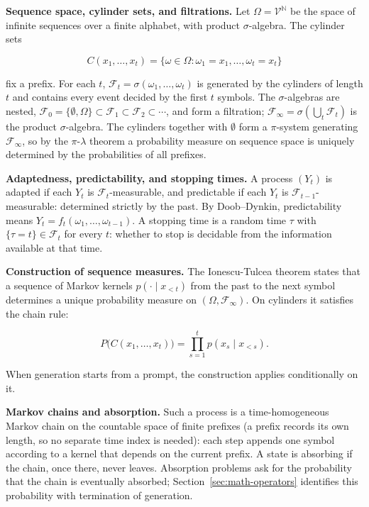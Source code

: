 \textbf{Sequence space, cylinder sets, and filtrations.} Let \(\Omega =
\mathcal{V}^{\mathbb{N}}\) be the space of infinite sequences over a finite
alphabet, with product \(\sigma\)-algebra. The cylinder sets

\[
C(x_1, \dots, x_t) = \{ \omega \in \Omega : \omega_1 = x_1, \dots, \omega_t = x_t \}
\]

fix a prefix. For each \(t\), \(\mathcal{F}_{t} = \sigma(\omega_{1}, \ldots, \omega_{t})\) is
generated by the cylinders of length \(t\) and contains every event decided
by the first \(t\) symbols. The \(\sigma\)-algebras are nested, \(\mathcal{F}_{0} = \{\emptyset, \Omega\}
\subset \mathcal{F}_{1} \subset \mathcal{F}_{2} \subset \cdots\), and form a filtration; \(\mathcal{F}_\infty = \sigma(\bigcup_{t}
\mathcal{F}_{t})\) is the product \(\sigma\)-algebra. The cylinders together with \(\emptyset\) form
a \(\pi\)-system generating \(\mathcal{F}_\infty\), so by the \(\pi\)-\(\lambda\) theorem a probability measure
on sequence space is uniquely determined by the probabilities of all
prefixes.

\textbf{Adaptedness, predictability, and stopping times.} A process
\((Y_t)\) is adapted if each \(Y_t\) is \(\mathcal{F}_t\)-measurable, and predictable if
each \(Y_t\) is \(\mathcal{F}_{t-1}\)-measurable: determined strictly by the past. By
Doob--Dynkin, predictability means \(Y_t = f_t(\omega_{1}, \ldots,
\omega_{t-1})\). A stopping time is a random time \(\tau\) with \(\{\tau = t\} \in \mathcal{F}_t\) for
every \(t\): whether to stop is decidable from the information available at
that time.

\textbf{Construction of sequence measures.} The Ionescu-Tulcea theorem
states that a sequence of Markov kernels \(p(\cdot \mid
x_{<t})\) from the past to the next symbol determines a unique
probability measure on \((\Omega, \mathcal{F}_\infty)\). On cylinders it satisfies the chain
rule:

\[
P\big(C(x_1, \dots, x_t)\big) = \prod_{s=1}^{t} p(x_s \mid x_{<s}).
\]

When generation starts from a prompt, the construction applies
conditionally on it.

\textbf{Markov chains and absorption.} Such a process is a
time-homogeneous Markov chain on the countable space of finite
prefixes (a prefix records its own length, so no separate time index is
needed): each step appends one symbol according to a kernel that
depends on the current prefix. A state is absorbing if the chain, once
there, never leaves. Absorption problems ask for the probability that
the chain is eventually absorbed; Section~\ref{sec:math-operators} identifies this probability
with termination of generation.

